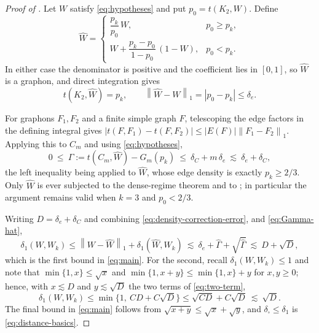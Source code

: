 \documentclass[11pt]{article}
\theoremstyle{remark}
\newcommand{\dsq}{\delta_{\square}}
\newcommand{\norm}[1]{\left\lVert #1\right\rVert}
\newcommand{\abs}[1]{\left\lvert #1\right\rvert}
\begin{document}
\begin{proof}[Proof of ]
Let $W$ satisfy \eqref{eq:hypotheses} and put $p_0=t(K_2,W)$. Define
\begin{equation}\label{eq:density-correction}
 \widehat W=
 \begin{cases}
 \dfrac{p_k}{p_0}\,W, & p_0\geq p_k,\\[8pt]
 W+\dfrac{p_k-p_0}{1-p_0}\,(1-W), & p_0<p_k .
 \end{cases}
\end{equation}
In either case the denominator is positive and the coefficient lies in
$[0,1]$, so $\widehat W$ is a graphon, and direct integration gives
\begin{equation}\label{eq:density-correction-error}
 t(K_2,\widehat W)=p_k,
 \qquad
 \norm{\widehat W-W}_1=\abs{p_0-p_k}\leq\delta_e .
\end{equation}

For graphons $F_1,F_2$ and a finite simple graph $F$, telescoping the
edge factors in the defining integral gives
$\abs{t(F,F_1)-t(F,F_2)}\leq\abs{E(F)}\norm{F_1-F_2}_1$. Applying this to
$C_m$ and using \eqref{eq:hypotheses},
\begin{equation}\label{eq:Gamma-hat}
 0\ \leq\ \widehat\Gamma:=t(C_m,\widehat W)-G_m(p_k)
 \ \leq\ \delta_C+m\,\delta_e
 \ \lesssim\ \delta_e+\delta_C ,
\end{equation}
the left inequality being \cite[Theorem~1.1]{kim2026goodman} applied to
$\widehat W$, whose edge density is exactly $p_k\geq2/3$. Only
$\widehat W$ is ever subjected to the dense-regime theorem and to
; in particular the argument remains valid when $k=3$
and $p_0<2/3$.

Writing $D=\delta_e+\delta_C$ and combining
\eqref{eq:density-correction-error},  and
\eqref{eq:Gamma-hat},
\begin{equation}\label{eq:two-term}
 \delta_1(W,W_k)\leq\norm{W-\widehat W}_1+\delta_1(\widehat W,W_k)
 \ \lesssim\ \delta_e+\widehat\Gamma+\sqrt{\widehat\Gamma}
 \ \lesssim\ D+\sqrt D ,
\end{equation}
which is the first bound in \eqref{eq:main}. For the second, recall
$\delta_1(W,W_k)\leq1$ and note that $\min\{1,x\}\leq\sqrt x$ and
$\min\{1,x+y\}\leq\min\{1,x\}+y$ for $x,y\geq0$; hence, with
$x\lesssim D$ and $y\lesssim\sqrt D$ the two terms of
\eqref{eq:two-term},
\[
 \delta_1(W,W_k)\leq\min\bigl\{1,\ C D+C\sqrt D\bigr\}
 \leq\sqrt{CD}+C\sqrt D\ \lesssim\ \sqrt D .
\]
The final bound in \eqref{eq:main} follows from
$\sqrt{x+y}\leq\sqrt x+\sqrt y$, and $\dsq\leq\delta_1$ is
\eqref{eq:distance-basics}.
\end{proof}
\end{document}
